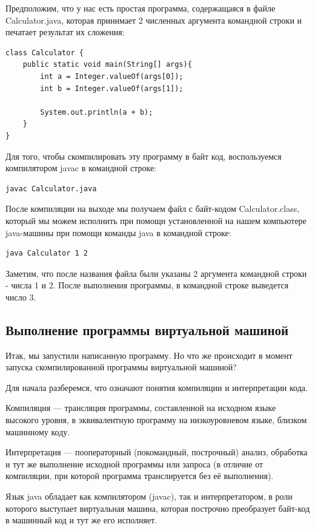 \documentclass[]{scrartcl}
\begin{document}
Предположим, что у нас есть простая программа, содержащаяся в файле Calculator.java, которая принимает 2 численных аргумента командной строки и печатает результат их сложения:

\begin{lstlisting}
class Calculator {
	public static void main(String[] args){
		int a = Integer.valueOf(args[0]);
		int b = Integer.valueOf(args[1]);

		System.out.println(a + b);
	}
}
\end{lstlisting}

Для того, чтобы скомпилировать эту программу в байт код, воспользуемся компилятором javac в командной строке:

\begin{lstlisting}
javac Calculator.java
\end{lstlisting}

После компиляции на выходе мы получаем файл с байт-кодом Calculator.class, который мы можем исполнить при помощи установленной на нашем компьютере java-машины при помощи команды java в командной строке:

\begin{lstlisting}
java Calculator 1 2
\end{lstlisting}

Заметим, что после названия файла были указаны 2 аргумента командной строки - числа 1 и 2. После выполнения программы, в командной строке выведется число 3.

\subsection{Выполнение программы виртуальной машиной}

Итак, мы запустили написанную программу. Но что же происходит в момент запуска скомпилированной программы виртуальной машиной?

Для начала разберемся, что означают понятия компиляции и интерпретации кода.

Компиляция — трансляция программы, составленной на исходном языке высокого уровня, в эквивалентную программу на низкоуровневом языке, близком машинному коду. 

Интерпретация — пооператорный (покомандный, построчный) анализ, обработка и тут же выполнение исходной программы или запроса (в отличие от компиляции, при которой программа транслируется без её выполнения).

Язык java обладает как компилятором (javac), так и интерпретатором, в роли которого выступает виртуальная машина, которая построчно преобразует байт-код в машинный код и тут же его исполняет. 
\end{document}
